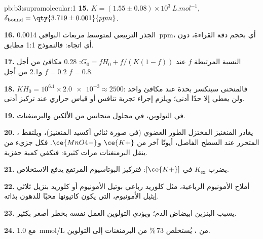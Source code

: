 \begin{solution}{pb:b3:supramolecular:1}
\textbf{15.} $K = (1.55 \pm 0.08) \times 10^3\ \unit{L.mol^{-1}}$, $\delta_{\mathrm{bound}} = \qty{3.719 \pm 0.001}{ppm}$.

\textbf{16.} الجذر التربيعي لمتوسط مربعات البواقي \qty{0.0014}{ppm}، أي بحجم دقة
القراءة، دون أي اتجاه: فالنموذج 1:1 مطابق.

\textbf{17.} النسبة المرتبطة $f$ عند $G_0 = fH_0 + f/(K(1 - f))$: 0.28 مكافئ من أجل $f = 0.2$ و2.1 من أجل $f = 0.8$.

\textbf{18.} $KH_0 = 10^{6.1} \times \num{2.0e-3} \approx 2500$: فالمنحنى سينكسر بحدة عند مكافئ واحد
ولن يعطي إلا حدًا أدنى؛ ويلزم إجراء تجربة تنافس أو قياس حراري عند
تركيز أدنى.

\textbf{19.} في التولوين، في محلول متجانس من الألكين والبرمنغنات.

\textbf{20.} يغادر المنغنيز المختزل الطور العضوي (في صورة ثنائي أكسيد المنغنيز)،
ويلتقط ، المتحرر عند السطح الفاصل، أيونًا آخر من $\ce{K+}$ و$\ce{MnO4-}$. فكل جزيء
من  ينقل البرمنغنات مرات كثيرة: فتكفي كمية حفزية.

\textbf{21.} يضرب $K_{\mathrm{ex}}$ في $[\ce{K+}]$: فتركيز البوتاسيوم المرتفع يدفع الاستخلاص.

\textbf{22.} أملاح الأمونيوم الرباعية، مثل كلوريد رباعي بوتيل الأمونيوم أو
كلوريد بنزيل ثلاثي إيثيل الأمونيوم، التي يكون كاتيونها محبًا للدهون بذاته.

\textbf{23.} يسبب البنزين ابيضاض الدم؛ ويؤدي التولوين العمل نفسه بخطر أصغر
بكثير.

\textbf{24.} مع \qty{1.0}{mmol/L} من ، يُستخلص 73\,\% من البرمنغنات إلى
التولوين.
\end{solution}
